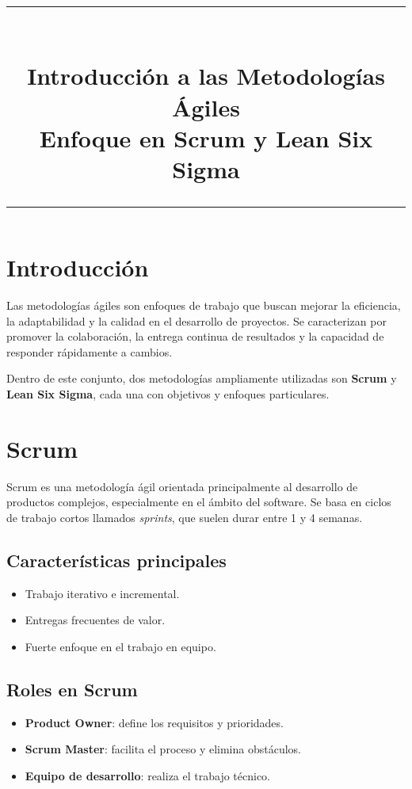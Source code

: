 \documentclass[a4paper,12pt]{article}
\title{
\vspace{-2cm}
\begin{center}
\LARGE
\rule{\textwidth}{0.5pt} \\[0.3em]
\bfseries
Introducción a las Metodologías Ágiles\\[0.2em]
\large Enfoque en Scrum y Lean Six Sigma
\\[0.3em]
\rule{\textwidth}{0.5pt}
\end{center}
\vspace{-1.5cm}
}
\author{}
\date{}
\begin{document}
\maketitle

\section{Introducción}
Las metodologías ágiles son enfoques de trabajo que buscan mejorar la eficiencia, la adaptabilidad y la calidad en el desarrollo de proyectos. Se caracterizan por promover la colaboración, la entrega continua de resultados y la capacidad de responder rápidamente a cambios.

Dentro de este conjunto, dos metodologías ampliamente utilizadas son \textbf{Scrum} y \textbf{Lean Six Sigma}, cada una con objetivos y enfoques particulares.

\section{Scrum}
Scrum es una metodología ágil orientada principalmente al desarrollo de productos complejos, especialmente en el ámbito del software. Se basa en ciclos de trabajo cortos llamados \textit{sprints}, que suelen durar entre 1 y 4 semanas.

\subsection{Características principales}
\begin{itemize}
    \item Trabajo iterativo e incremental.
    \item Entregas frecuentes de valor.
    \item Fuerte enfoque en el trabajo en equipo.
\end{itemize}

\subsection{Roles en Scrum}
\begin{itemize}
    \item \textbf{Product Owner}: define los requisitos y prioridades.
    \item \textbf{Scrum Master}: facilita el proceso y elimina obstáculos.
    \item \textbf{Equipo de desarrollo}: realiza el trabajo técnico.
\end{itemize}
\end{document}
